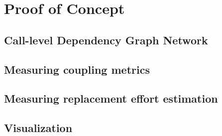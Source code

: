 \chapter{Proof of Concept}\label{ch:PoC}

\section{Call-level Dependency Graph Network}


\section{Measuring coupling metrics}

\section{Measuring replacement effort estimation}

\section{Visualization}
